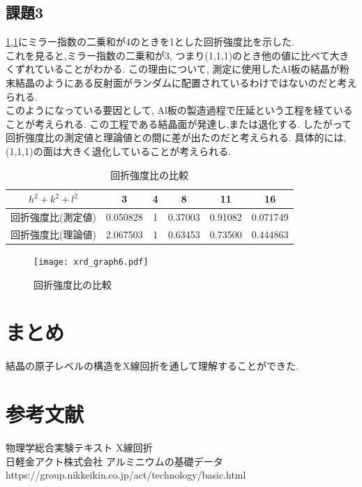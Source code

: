 \documentclass[11pt]{ltjsarticle}
\begin{document}
    \subsection*{課題3}
      \cref{tab:kaisetu},\cref{fig:kaisetu}にミラー指数の二乗和が4のときを1とした回折強度比を示した.\\
      これを見ると,ミラー指数の二乗和が3, つまり(1,1,1)のとき他の値に比べて大きくずれていることがわかる. この理由について, 測定に使用したAl板の結晶が粉末結晶のようにある反射面がランダムに配置されているわけではないのだと考えられる.\\
      このようになっている要因として, Al板の製造過程で圧延という工程を経ていることが考えられる. この工程である結晶面が発達し,または退化する. したがって回折強度比の測定値と理論値との間に差が出たのだと考えられる. 具体的には, (1,1,1)の面は大きく退化していることが考えられる.
      \begin{table}[H]
        \centering
        \begin{tabular}{|c|c|c|c|c|c|}\hline
          $h^2 + k^2 + l^2$&3&4&8&11&16\\\hline
          回折強度比(測定値)&0.050828&1&0.37003&0.91082&0.071749\\\hline
          回折強度比(理論値)&2.067503&1&0.63453&0.73500&0.444863\\\hline
        \end{tabular}
        \caption{回折強度比の比較}
        \label{tab:kaisetu}
      \end{table}
      \begin{figure}[H]
        \centering
        \texttt{[image: xrd\_graph6.pdf]}
        \caption{回折強度比の比較}
        \label{fig:kaisetu}
      \end{figure}
  \section*{まとめ}
    結晶の原子レベルの構造をX線回折を通して理解することができた.
  \section*{参考文献}
    \noindent 物理学総合実験テキスト X線回折\\
    日軽金アクト株式会社 アルミニウムの基礎データ https://group.nikkeikin.co.jp/act/technology/basic.html
\end{document}
